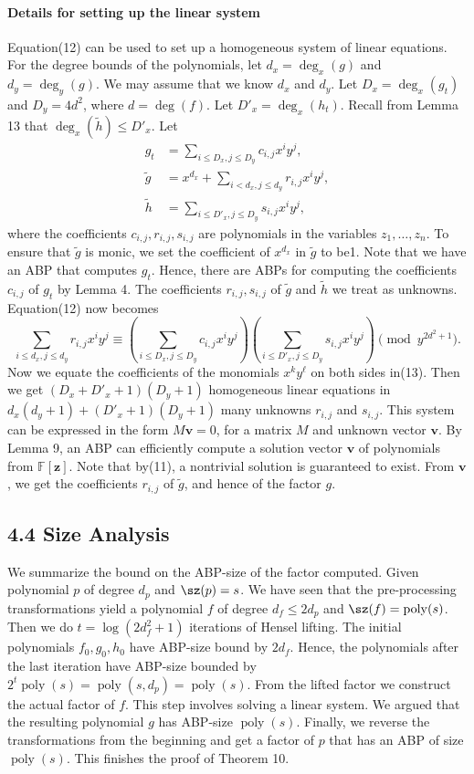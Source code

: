 \paragraph{Details for setting up the linear system}
Equation(12) can be used to set up a homogeneous system of linear equations. For the degree bounds of the polynomials, let $d_x=\deg_x(g)$ and $d_y=\deg_y(g)$. We may assume that we know $d_x$ and $d_y$. Let $D_x=\deg_x(g_t)$ and $D_y=4d^2$, where $d=\deg(f)$. Let $D'_x=\deg_x(h_t)$. Recall from Lemma 13 that $\deg_x(\widetilde h)\leq D'_x$. Let
\begin{align*}g_t&=\sum_{i\leq D_x,j\leq D_y}c_{i,j}x^iy^j,\\\widetilde g&=x^{d_x}+\sum_{i<d_x,j\leq d_y}r_{i,j}x^iy^j,\\\widetilde h&=\sum_{i\leq D'_x,j\leq D_y}s_{i,j}x^iy^j,\end{align*}
where the coefficients $c_{i,j},r_{i,j},s_{i,j}$ are polynomials in the variables $z_1,\ldots,z_n$. To ensure that $\widetilde g$ is monic, we set the coefficient of $x^{d_x}$ in $\widetilde g$ to be1.
Note that we have an ABP that computes $g_t$. Hence, there are ABPs for computing the coefficients $c_{i,j}$ of $g_t$ by Lemma 4. The coefficients $r_{i,j},s_{i,j}$ of $\widetilde g$ and $\widetilde h$ we treat as unknowns. Equation(12) now becomes
\begin{equation}\sum_{i\leq d_x,j\leq d_y}r_{i,j}x^iy^j\equiv\left(\sum_{i\leq D_x,j\leq D_y}c_{i,j}x^iy^j\right)\left(\sum_{i\leq D'_x,j\leq D_y}s_{i,j}x^iy^j\right)\pmod{y^{2d^2+1}}.\tag{13}\end{equation}
Now we equate the coefficients of the monomials $x^ky^\ell$ on both sides in(13). Then we get $(D_x+D'_x+1)(D_y+1)$ homogeneous linear equations in $d_x(d_y+1)+(D'_x+1)(D_y+1)$ many unknowns $r_{i,j}$ and $s_{i,j}$. This system can be expressed in the form $M\mathbf v=0$, for a matrix $M$ and unknown vector $\mathbf v$.
By Lemma 9, an ABP can efficiently compute a solution vector $\mathbf v$ of polynomials from $\mathbb F[\mathbf z]$. Note that by(11), a nontrivial solution is guaranteed to exist. From $\mathbf v$, we get the coefficients $r_{i,j}$ of $\widetilde g$, and hence of the factor $g$.
\subsection*{4.4 Size Analysis}
We summarize the bound on the ABP-size of the factor computed. Given polynomial $p$ of degree $d_p$ and $\sz(p)=s$. We have seen that the pre-processing transformations yield a polynomial $f$ of degree $d_f\leq2d_p$ and $\sz(f)=\operatorname{poly}(s)$. Then we do $t=\log(2d_f^2+1)$ iterations of Hensel lifting. The initial polynomials $f_0,g_0,h_0$ have ABP-size bound by $2d_f$. Hence, the polynomials after the last iteration have ABP-size bounded by $2^t\operatorname{poly}(s)=\operatorname{poly}(s,d_p)=\operatorname{poly}(s)$.
From the lifted factor we construct the actual factor of $f$. This step involves solving a linear system. We argued that the resulting polynomial $g$ has ABP-size $\operatorname{poly}(s)$.
Finally, we reverse the transformations from the beginning and get a factor of $p$ that has an ABP of size $\operatorname{poly}(s)$. This finishes the proof of Theorem 10.
